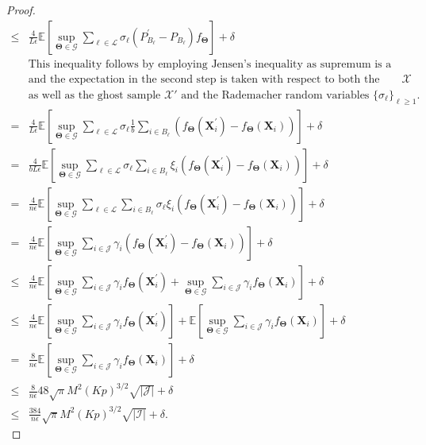 \documentclass{article}
\newcommand{\bX}{\boldsymbol{X}}
\newcommand{\bTheta}{\boldsymbol{\Theta}}
\newcommand{\I}{\mathcal{I}}
\newcommand{\E}{\mathbb{E}}
\newcommand{\J}{\mathcal{J}}
\newcommand{\cL}{\mathcal{L}}
\begin{document}
\begin{proof}
\begin{align}
     \le & \frac{4}{L \epsilon}\E\left[\sup_{\bTheta \in \mathscr{G}}\sum_{\ell \in \cL}\sigma_\ell  (P^\prime_{B_\ell}-P_{B_\ell})f_{\bTheta} \right]+ \delta \nonumber \\
     & \text{This inequality follows by employing Jensen's inequality as supremum is a convex function,}\nonumber\\ & \text{and the expectation in the second step is taken with respect to both the original sample $\mathcal{X}$}\nonumber\\ & \text{as well as the ghost sample $\mathcal{X}'$ and the Rademacher random variables $\{\sigma_{\ell}\}_{\ell\ge 1}$.}\nonumber\\
     = & \frac{4}{L \epsilon}\E\left[\sup_{\bTheta \in \mathscr{G}}\sum_{\ell \in \cL}\sigma_\ell  \frac{1}{b}\sum_{i \in B_\ell}(f_{\bTheta}(\bX_i^\prime)-f_{\bTheta}(\bX_i)) \right]+ \delta \nonumber \\
     = & \frac{4}{b L \epsilon}\E\left[\sup_{\bTheta \in \mathscr{G}}\sum_{\ell \in \cL}\sigma_\ell  \sum_{i \in B_\ell} \xi_i(f_{\bTheta}(\bX_i^\prime)-f_{\bTheta}(\bX_i)) \right]+ \delta \label{eq8} \\
     = & \frac{4}{n \epsilon}\E\left[\sup_{\bTheta \in \mathscr{G}}\sum_{\ell \in \cL}  \sum_{i \in B_\ell} \sigma_\ell \xi_i(f_{\bTheta}(\bX_i^\prime)-f_{\bTheta}(\bX_i)) \right]+ \delta \nonumber \\
     = & \frac{4}{n \epsilon}\E\left[\sup_{\bTheta \in \mathscr{G}} \sum_{i \in \J} \gamma_i (f_{\bTheta}(\bX_i^\prime)-f_{\bTheta}(\bX_i)) \right]+ \delta \label{eq9} \\
     \le &  \frac{4}{n \epsilon}\E\left[\sup_{\bTheta \in \mathscr{G}} \sum_{i \in \J} \gamma_i f_{\bTheta}(\bX_i^\prime)+ \sup_{\bTheta \in \mathscr{G}} \sum_{i \in \J} \gamma_i f_{\bTheta}(\bX_i) \right]+ \delta\\
     \le & \frac{4}{n \epsilon}\E\left[\sup_{\bTheta \in \mathscr{G}} \sum_{i \in \J} \gamma_i f_{\bTheta}(\bX_i^\prime)\right]+\E\left[ \sup_{\bTheta \in \mathscr{G}} \sum_{i \in \J} \gamma_i f_{\bTheta}(\bX_i) \right]+ \delta\\
     = & \frac{8}{n \epsilon}\E\left[\sup_{\bTheta \in \mathscr{G}} \sum_{i \in \J} \gamma_i f_{\bTheta}(\bX_i) \right]+ \delta \nonumber \\
     \le & \frac{8}{n \epsilon} 48 \sqrt{\pi}  M^2  (Kp)^{3/2}  \sqrt{|\J|} + \delta \label{eq10} \\
     \le & \frac{384}{n \epsilon}  \sqrt{\pi}  M^2  (Kp)^{3/2} \sqrt{|\I|} + \delta. \label{eq11}
\end{align}
\endgroup


\end{proof}
\end{document}
